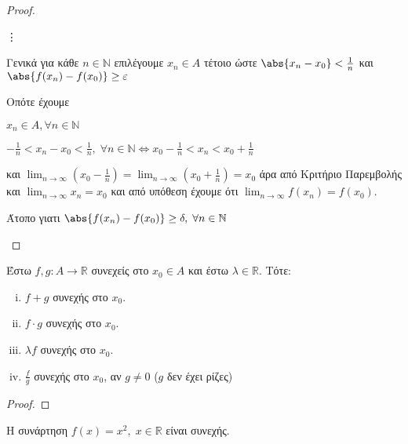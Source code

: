 \documentclass[main.tex]{subfiles}
\begin{document}
\begin{proof}
\begin{description}
\begin{myitemize}
                \hspace{0.2\textwidth} \vdots 
            \end{myitemize}
            Γενικά για κάθε $ n \in \mathbb{N} $ επιλέγουμε $ x_{n} \in A $ 
            τέτοιο ώστε $ \abs{x_{n}- x_{0}} < \frac{1}{n} $ και 
            $ \abs{f(x_{n}) - f(x_{0})} \geq \varepsilon  $

            Οπότε έχουμε
            \begin{myitemize}
            \item $ x_{n} \in A, \forall n \in \mathbb{N} $ 
            \item $ - \frac{1}{n} < x_{n} - x_{0} < \frac{1}{n}, \; 
                \forall n \in \mathbb{N} 
                \Leftrightarrow x_{0}- \frac{1}{n} < x_{n} < x_{0}+ \frac{1}{n} $ 
            \end{myitemize}
            και $ \lim_{n \to \infty} (x_{0}- \frac{1}{n}) = 
            \lim_{n \to \infty} (x_{0}+ \frac{1}{n}) = x_{0} $ άρα από Κριτήριο 
            Παρεμβολής και $ \lim_{n \to \infty} x_{n} = x_{0} $ και από υπόθεση 
            έχουμε ότι $ \lim_{n \to \infty} f(x_{n}) = f(x_{0}) $.

            Άτοπο γιατι $ \abs{f(x_{n})- f(x_{0})} \geq \delta, 
            \; \forall n \in \mathbb{N}$
    \end{description}
\end{proof}

\begin{prop}
    Έστω $ f,g \colon A \to \mathbb{R} $ συνεχείς στο $ x_{0} \in A $ και έστω 
    $ \lambda \in \mathbb{R} $. Τότε:
    \begin{enumerate}[i)]
        \item $ f+g $ συνεχής στο $ x_{0} $.
        \item $ f\cdot g $ συνεχής στο $ x_{0} $.
        \item $ \lambda f $ συνεχής στο $ x_{0} $.
        \item $ \frac{f}{g} $ συνεχής στο $ x_{0} $, αν $g \neq 0$ ($g$ δεν έχει
            ρίζες) 
    \end{enumerate}
\end{prop}

\begin{proof}

\end{proof}

\begin{prop}
    Η συνάρτηση $ f(x)=x^{2}, \; x \in \mathbb{R} $ είναι συνεχής.
\end{prop}
\end{document}
